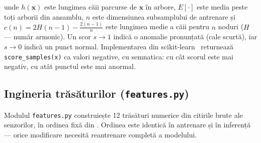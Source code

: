unde $h(\mathbf{x})$ este lungimea căii parcurse de $\mathbf{x}$ în arbore, $E[\cdot]$
este media peste toți arborii din ansamblu, $n$ este dimensiunea subsamplului de antrenare
și $c(n) = 2H(n-1) - \tfrac{2(n-1)}{n}$ este lungimea medie a căii pentru $n$ noduri
($H$ — număr armonic). Un scor $s \to 1$ indică o anomalie pronunțată (cale scurtă),
iar $s \to 0$ indică un punct normal. Implementarea din scikit-learn~\cite{pedregosa2011scikit}
returnează \texttt{score\_samples(x)} ca valori negative, cu semnatica: cu cât scorul
este mai negativ, cu atât punctul este mai anormal.

\subsection{Ingineria trăsăturilor (\texttt{features.py})}

Modulul \texttt{features.py} construiește 12 trăsături numerice din citirile brute ale
senzorilor, în ordinea fixă din . Ordinea este identică în
antrenare și în inferență — orice modificare necesită reantrenare completă a modelului.

